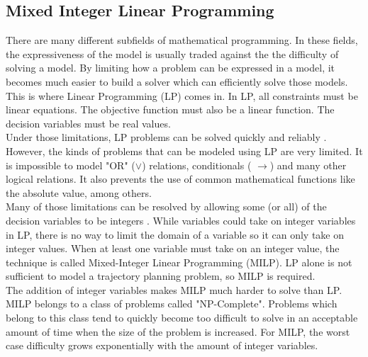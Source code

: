 \subsection{Mixed Integer Linear Programming}
There are many different subfields of mathematical programming. In these fields, the expressiveness of the model is usually traded against the the difficulty of solving a model. By limiting how a problem can be expressed in a model, it becomes much easier to build a solver which can efficiently solve those models. This is where Linear Programming (LP) comes in. In LP, all constraints must be linear equations. The objective function must also be a linear function. The decision variables must be real values. \\
Under those limitations, LP problems can be solved quickly and reliably \cite{Dantzig1963}. However, the kinds of problems that can be modeled using LP are very limited. It is impossible to model "OR" ($\vee$) relations, conditionals ( $\rightarrow$) and many other logical relations. It also prevents the use of common mathematical functions like the absolute value, among others. \\
Many of those limitations can be resolved by allowing some (or all) of the decision variables to be integers \cite{Mitra1994}. While variables could take on integer variables in LP, there is no way to limit the domain of a variable so it can only take on integer values. When at least one variable must take on an integer value, the technique is called Mixed-Integer Linear Programming (MILP). LP alone is not sufficient to model a trajectory planning problem, so MILP is required.\\
The addition of integer variables makes MILP much harder to solve than LP. MILP belongs to a class of problems called "NP-Complete". Problems which belong to this class tend to quickly become too difficult to solve in an acceptable amount of time when the size of the problem is increased. For MILP, the worst case difficulty grows exponentially with the amount of integer variables.

